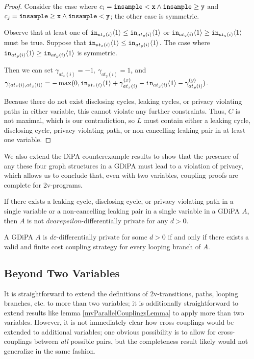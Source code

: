 \begin{proof}
    Consider the case where $c_i = \lguard[\texttt{x}]\land\gguard[\texttt{y}]$ and $c_j = \gguard[\texttt{x}]\land\lguard[\texttt{y}]$; the other case is symmetric.

    Observe that at least one of $\texttt{in}_{at_x(i)}\brangle{1}\leq \texttt{in}_{at_y(i)}\brangle{1}$ or $\texttt{in}_{at_y(i)}\brangle{1}\geq \texttt{in}_{at_y(i)}\brangle{1}$ must be true. Suppose that $\texttt{in}_{at_x(i)}\brangle{1}\leq \texttt{in}_{at_y(i)}\brangle{1}$. The case where $\texttt{in}_{at_y(i)}\brangle{1}\geq \texttt{in}_{at_y(i)}\brangle{1}$ is symmetric. 

    Then we can set $\gamma_{at_x(i)} = -1$, $\gamma_{at_y(i)}=1$, and $\gamma_{(at_x(i), at_y(i))} =  -\max(0, \texttt{in}_{at_x(i)}\brangle{1}+ \gamma_{at_x(i)}^{(x)}-\texttt{in}_{at_y(i)}\brangle{1}-\gamma_{at_y(i)}^{(y)})$. 
    
    Because there do not exist disclosing cycles, leaking cycles, or privacy violating paths in either variable, this cannot violate any further constraints. Thus, $C$ is not maximal, which is our contradiction, so $L$ must contain either a leaking cycle, disclosing cycle, privacy violating path, or non-cancelling leaking pair in at least one variable.
\end{proof}

We also extend the DiPA counterexample results to show that the presence of any these four graph structures in a GDiPA must lead to a violation of privacy, which allows us to conclude that, even with two variables, coupling proofs are complete for 2v-programs.

\begin{lemma}
    If there exists a leaking cycle, disclosing cycle, or privacy violating path in a single variable or a non-cancelling leaking pair in a single variable in a GDiPA $A$, then $A$ is not $dvarepsilon$-differentially private for any $d>0$. 
\end{lemma}

\begin{thm}
    A GDiPA $A$ is $d\varepsilon$-differentially private for some $d>0$ if and only if there exists a valid and finite cost coupling strategy for every looping branch of $A$. 
\end{thm}

\subsection{Beyond Two Variables}

It is straightforward to extend the definitions of 2v-transitions, paths, looping branches, etc. to more than two variables; it is additionally straightforward to extend results like lemma \ref{mvParallelCouplingsLemma} to apply more than two variables. However, it is not immediately clear how cross-couplings would be extended to additional variables;
one obvious possibility is to allow for cross-couplings between \textit{all} possible pairs, but the completeness result likely would not generalize in the same fashion. 

